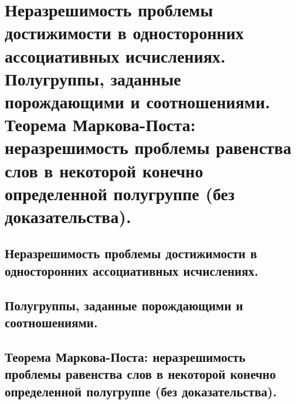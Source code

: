 \section{Неразрешимость проблемы достижимости в односторонних ассоциативных исчислениях. Полугруппы, заданные порождающими и соотношениями. Теорема Маркова-Поста: неразрешимость проблемы равенства слов в некоторой конечно определенной полугруппе (без доказательства).}

\subsection{Неразрешимость проблемы достижимости в односторонних ассоциативных исчислениях.}

\subsection{Полугруппы, заданные порождающими и соотношениями.}

\subsection{Теорема Маркова-Поста: неразрешимость проблемы равенства слов в некоторой конечно определенной полугруппе (без доказательства).}

\begin{theorem}
  
\end{theorem}